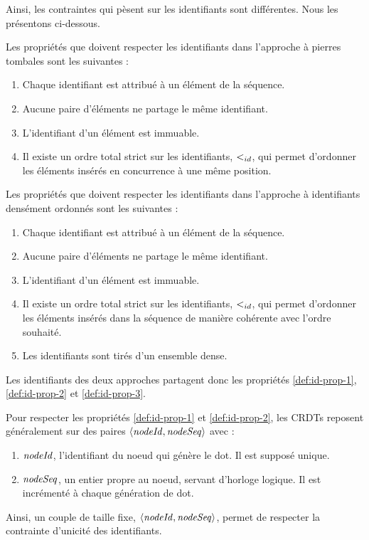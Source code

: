 Ainsi, les contraintes qui pèsent sur les identifiants sont différentes.
Nous les présentons ci-dessous.
\begin{definition}
  Les propriétés que doivent respecter les identifiants dans l'approche à pierres tombales sont les suivantes :
  \begin{enumerate}
    \item Chaque identifiant est attribué à un élément de la séquence.
    \item Aucune paire d'éléments ne partage le même identifiant.
    \item L'identifiant d'un élément est immuable.
    \item Il existe un ordre total strict sur les identifiants, $<_{id}$, qui permet d'ordonner les éléments insérés en concurrence à une même position.
  \end{enumerate}
\end{definition}
\begin{definition}
  \label{def:id-prop}
  Les propriétés que doivent respecter les identifiants dans l'approche à identifiants densément ordonnés sont les suivantes :
  \begin{enumerate}
    \item \label{def:id-prop-1} Chaque identifiant est attribué à un élément de la séquence.
    \item \label{def:id-prop-2} Aucune paire d'éléments ne partage le même identifiant.
    \item \label{def:id-prop-3} L'identifiant d'un élément est immuable.
    \item \label{def:id-prop-4} Il existe un ordre total strict sur les identifiants, $<_{id}$, qui permet d'ordonner les éléments insérés dans la séquence de manière cohérente avec l'ordre souhaité.
    \item \label{def:id-prop-5} Les identifiants sont tirés d'un ensemble dense.
  \end{enumerate}
\end{definition}
Les identifiants des deux approches partagent donc les propriétés \ref{def:id-prop-1}, \ref{def:id-prop-2} et \ref{def:id-prop-3}.

Pour respecter les propriétés \ref{def:id-prop-1} et \ref{def:id-prop-2}, les \acp{CRDT} reposent généralement sur des paires $\langle \mathit{nodeId}, \mathit{nodeSeq} \rangle$ avec :
\begin{enumerate}
  \item $\mathit{nodeId}$, l'identifiant du noeud qui génère le dot.
    Il est supposé unique.
  \item $\mathit{nodeSeq}$, un entier propre au noeud, servant d'horloge logique.
    Il est incrémenté à chaque génération de dot.
\end{enumerate}
Ainsi, un couple de taille fixe, $\langle \mathit{nodeId},\mathit{nodeSeq} \rangle$, permet de respecter la contrainte d'unicité des identifiants.


